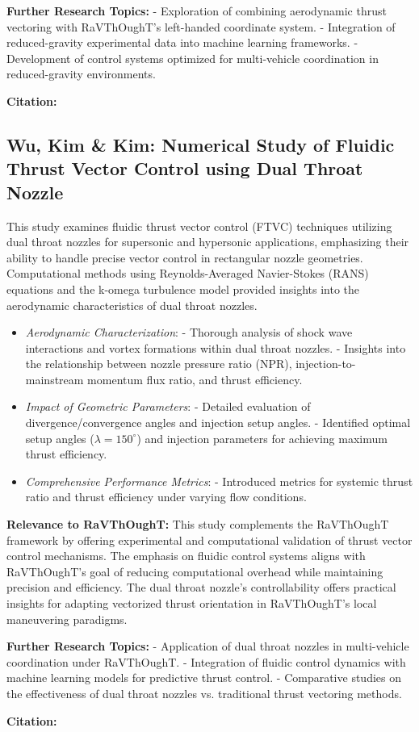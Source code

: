\textbf{Further Research Topics:}
- Exploration of combining aerodynamic thrust vectoring with RaVThOughT’s left-handed coordinate system.
- Integration of reduced-gravity experimental data into machine learning frameworks.
- Development of control systems optimized for multi-vehicle coordination in reduced-gravity environments.

\textbf{Citation:} 

\subsection{Wu, Kim \& Kim: Numerical Study of Fluidic Thrust Vector Control using Dual Throat Nozzle}

This study examines fluidic thrust vector control (FTVC) techniques utilizing dual throat nozzles for supersonic and hypersonic applications, emphasizing their ability to handle precise vector control in rectangular nozzle geometries. Computational methods using Reynolds-Averaged Navier-Stokes (RANS) equations and the k-omega turbulence model provided insights into the aerodynamic characteristics of dual throat nozzles.

\begin{itemize}
  \item \textit{Aerodynamic Characterization}:
  - Thorough analysis of shock wave interactions and vortex formations within dual throat nozzles.
  - Insights into the relationship between nozzle pressure ratio (NPR), injection-to-mainstream momentum flux ratio, and thrust efficiency.

  \item \textit{Impact of Geometric Parameters}:
  - Detailed evaluation of divergence/convergence angles and injection setup angles.
  - Identified optimal setup angles (\( \lambda = 150^\circ \)) and injection parameters for achieving maximum thrust efficiency.

  \item \textit{Comprehensive Performance Metrics}:
  - Introduced metrics for systemic thrust ratio and thrust efficiency under varying flow conditions.
\end{itemize}

\textbf{Relevance to RaVThOughT:}
This study complements the RaVThOughT framework by offering experimental and computational validation of thrust vector control mechanisms. The emphasis on fluidic control systems aligns with RaVThOughT's goal of reducing computational overhead while maintaining precision and efficiency. The dual throat nozzle’s controllability offers practical insights for adapting vectorized thrust orientation in RaVThOughT’s local maneuvering paradigms.

\textbf{Further Research Topics:}
- Application of dual throat nozzles in multi-vehicle coordination under RaVThOughT.
- Integration of fluidic control dynamics with machine learning models for predictive thrust control.
- Comparative studies on the effectiveness of dual throat nozzles vs. traditional thrust vectoring methods.

\textbf{Citation:} 

\endinput  %
